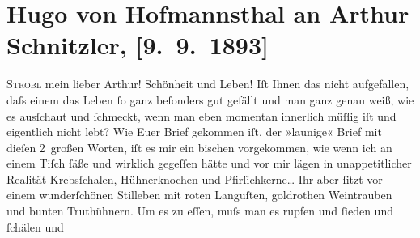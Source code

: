 

         
         \renewcommand{\erwaehntePersonen}{Personen: Richard Beer-Hofmann, Friedrich Michael Fels, Hugo August von Hofmannsthal, Anna von Hofmannsthal, Felix Salten}
         \renewcommand{\erwaehnteOrte}{Orte: Böhmen, München, Nürnberg, Strobl, Strohgasse, Wien, Znaim}
         \renewcommand{\erwaehnteWerke}{}
               \section[Hugo von Hofmannsthal an Arthur Schnitzler, {[}9. 9. 1893{]}]{ Hugo von Hofmannsthal an Arthur Schnitzler, {[}9. 9. 1893{]}}\nopagebreak{}\rehead{ }\begin{ledgroupsized}[t]{13cm}\normalsize\beginnumbering \toendnotes[C]{\smallbreak\pagebreak[2]} 
\toendnotes[C]{\smallbreak}\pstart
           \raggedleft{}{\pb}\textsc{Strobl}\pend
           \pstart{}mein lieber Arthur!\pend\pstart
           Schönheit und Leben! Iſt Ihnen das nicht aufgefallen, daſs einem das Leben ſo
                    ganz beſonders gut gefällt und man ganz genau weiß, wie es ausſchaut und
                    ſchmeckt, wenn man eben momentan innerlich müſſig iſt und eigentlich nicht lebt?
                    Wie Euer Brief gekommen
                    iſt, der »launige« Brief mit dieſen 2 großen Worten, iſt es mir ein bischen
                    vorgekommen, wie wenn ich an einem Tiſch ſäße und wirklich gegeſſen hätte und
                    vor mir lägen in unappetitlicher Realität {\pb}Krebsſchalen, Hühnerknochen
                    und Pfirſichkerne{\dots} Ihr aber ſitzt vor einem
                    wunderſchönen Stilleben mit roten Languſten, goldrothen Weintrauben und bunten
                    Truthühnern. Um es zu eſſen, muſs man es rupfen und ſieden und ſchälen und

\end{ledgroupsized}
